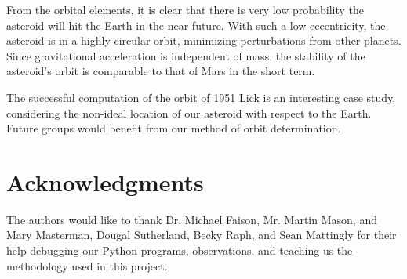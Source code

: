 \documentclass[12pt,journal,compsoc]{IEEEtran}
\begin{document}
From the orbital elements, it is clear that there is very low probability the asteroid will hit the Earth in the near future.
With such a low eccentricity, the asteroid is in a highly circular orbit, minimizing perturbations from other planets.
Since gravitational acceleration is independent of mass, the stability of the asteroid's orbit is comparable to that of Mars in the short term.

The successful computation of the orbit of 1951 Lick is an interesting case study, considering the non-ideal location of our asteroid with respect to the Earth.
Future groups would benefit from our method of orbit determination.

\section*{Acknowledgments}

The authors would like to thank Dr. Michael Faison, Mr. Martin Mason, and Mary Masterman, Dougal Sutherland, Becky Raph, and Sean Mattingly for their help debugging our Python programs, observations, and teaching us the methodology used in this project.

\end{document}
